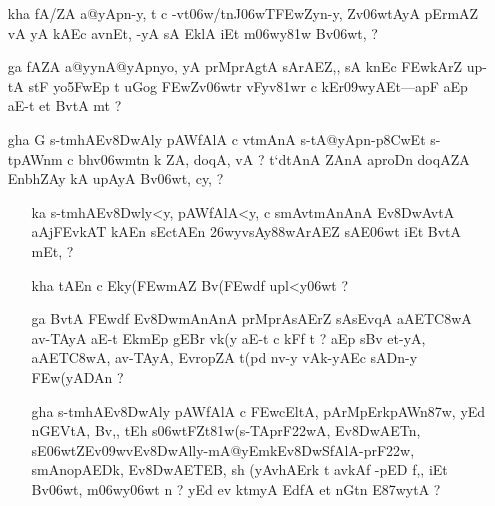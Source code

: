 \def\DevnagVersion{2.15}\documentclass{article}
\begin{document}
\begin{itemize}
 \item[\dn kha] {\dn fA/\0ZA a@yApn-y{\rs ,\re} t\? c -vt\306w/tnJ\306wT\3FEwZyn-y{\rs ,\re} Zv\306wtAyA\2 pErmAZ\? vA yA kAEc avnEt, -yA sA Ek\2lA iEt m\306wy\381w\? Bv\306wt, {\rs ?\re} }
 
 \item[\dn ga] {\dn fAZA a@yynA@yApnyo, yA prMprAgtA\2 sArAEZ,{\rs ,\re} sA k\?nEc \3FEwkAr\?Z up-tA stF yo\35FwEp t uGog\2 \3FEwZv\306wtr\2 vFy\0v\381wr\2 c kEr\309wyAEt{\rs ---\re}apF aEp aE-t et BvtA mt {\rs ?\re}} 
 
 \item[\dn gha] {\dn G} {\dn s\2-tmhAEv\38DwAly\? pAWfAlA c vt\0mAnA s\2-tA@yApn{\rs -\re}p\38CwEt s\2-tpAWnm\? c bhv\306wmt\?n k\? ZA, doqA, vA {\rs ?\re} t`dtAnA\2 ZAnA aproD\?n doqAZA\2 Enbh\0ZAy kA upAyA Bv\306wt, cy\?, {\rs ?\re} }
 
 
 \item[\dn 17]\begin{itemize}
               
               \item[\dn ka] {\dn s\2-tmhAEv\38Dwly\?<y, pAWfAlA<y, c smAvt\0mAnAnA\2 Ev\38DwAvtA aAjFEvkAT\0 kAEn sEctAEn \326wyvsAy\388wArAEZ sAE\306wt iEt BvtA\2 mEt, {\rs ?\re}}
               
               \item[\dn kha] {\dn tAEn c Eky(\3FEwmAZ\2 Bv(\3FEwd\?f\? upl<y\306wt\? {\rs ?\re}}
 
               \item[\dn ga] {\dn BvtA\2 \3FEwd\?f\? Ev\38DwmAnAnA\2 prMprAsAErZ\2 sA\2sEvqA aAET\3C8wA av-TAyA aE-t EkmEp gEBr\2 v\?k(y aE-t c\? kFf\2 t {\rs ?\re} aEp s\2Bv\? et-yA, aAET\0\3C8wA, av-TAyA, EvropZA t(pd\? nv-y vAk-yAEc sADn-y \3FEw(yADAn {\rs ?\re} } 
               
               \item[\dn gha] {\dn s\2-tmhAEv\38DwAly\? pAWfAlA c \3FEwcEltA, pArMpErkpAWn\387w, yEd nG\0EVtA, Bv\?,{\rs ,\re} tEh\2 s\306wtFZ\0t\381w(s\2-TAprF\322wA, Ev\38DwAET\2n, sE\306wtZ\0{\rs -\re}Ev\309wvEv\38DwAlly{\rs -\re}mA@yEmkEv\38DwSfAlA{\rs -\re}prF\322w\4, smAnopAEDk\4, Ev\38DwAET\2EB, sh (yAvhAErk\? t\? avkAf\? -pED\2\2 f,{\rs ,\re} iEt Bv\306wt, m\306wy\306wt\? n {\rs ?\re} yEd ev ktmyA EdfA et nG\0\1tn\2 E\387wytA {\rs ?\re}}
               

\end{itemize}
\end{itemize}
\end{document}
